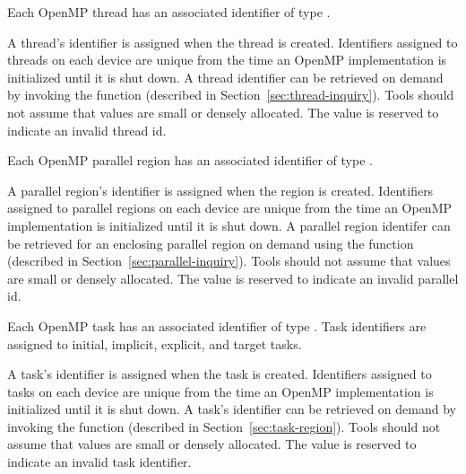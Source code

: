 
Each OpenMP thread  has an associated identifier of type .
\begin{comment}
\begin{boxedcode}
typedef uint64\_t ompt\_thread\_id\_t;
\end{boxedcode}
\end{comment}
  A thread's identifier is assigned when the thread is created.
  Identifiers assigned to threads on each device are unique from the time an OpenMP implementation is initialized until it is shut down.
  A thread identifier can be retrieved
  on demand by invoking the  
  function (described in Section~\ref{sec:thread-inquiry}).
  Tools should not assume that  values are small or densely allocated.
  The value  is reserved to indicate an invalid thread id.

Each OpenMP parallel region has an associated identifier of type
.
\begin{comment}
\begin{boxedcode}
typedef uint64\_t ompt\_parallel\_id\_t;
\end{boxedcode}
\end{comment}
  A parallel region's identifier is assigned
  when the region is created.  Identifiers assigned to parallel regions on each device are unique from the time an
  OpenMP implementation is initialized until it is shut down.
  A parallel region identifer can be retrieved for an enclosing parallel region
  on demand using the function   (described in Section~\ref{sec:parallel-inquiry}).
  Tools should not assume that  values are small or densely allocated.
  The value  is reserved to indicate an invalid parallel id.


Each OpenMP task has an associated identifier of type
. Task identifiers are assigned to
initial, implicit, explicit, and target tasks.
\begin{comment}
\begin{boxedcode}
typedef uint64\_t ompt\_task\_id\_t;
\end{boxedcode}
\end{comment}
  A task's identifier is assigned
  when the task is created.
  Identifiers assigned to tasks on each device are unique from the time an
  OpenMP implementation is initialized until it is shut down.
  A task's identifier can be retrieved
  on demand by invoking the   function (described in Section~\ref{sec:task-region}).
  Tools should not assume that  values are small or densely allocated.
  The value  is reserved to indicate an invalid task identifier.

